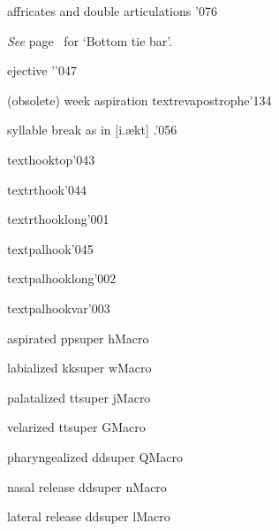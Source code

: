 %
  {affricates and double articulations}%
  {}{}{}{'076}

\hspace*{2em}\emph{See} page~\pageref{bottomtiebar} for `Bottom tie bar'.
\par\bigskip

%
  {ejective}%
  {'}{}{\ipaall}{'047}

%
  {(obsolete) week aspiration}%
  {\tbs textrevapostrophe}{}{\ipaold}{'134}

%
  {syllable break as in [\textturnr{}i.\ae{}kt]}%
  {.}{}{\ipanew}{'056}

%
  {}%
  {\tbs texthooktop}{}{}{'043}

%
  {}%
  {\tbs textrthook}{}{}{'044}

%
  {}%
  {\tbs textrthooklong}{}{}{'001}

%
  {}%
  {\tbs textpalhook}{}{}{'045}

%
  {}%
  {\tbs textpalhooklong}{}{}{'002}

%
  {}%
  {\tbs textpalhookvar}{}{}{'003}

%
  {aspirated}%
  {p}{p\tbs super h}{\ipaall}{Macro}

%
  {labialized}%
  {k}{k\tbs super w}{\ipaall}{Macro}

%
  {palatalized}%
  {t}{t\tbs super j}{\ipaall}{Macro}

%
  {velarized}%
  {t}{t\tbs super G}{\ipanew}{Macro}

%
  {pharyngealized}%
  {d}{d\tbs super Q}{\ipanew}{Macro}

%
  {nasal release}%
  {d}{d\tbs super n}{\ipanew}{Macro}

%
  {lateral release}%
  {d}{d\tbs super l}{\ipanew}{Macro}



